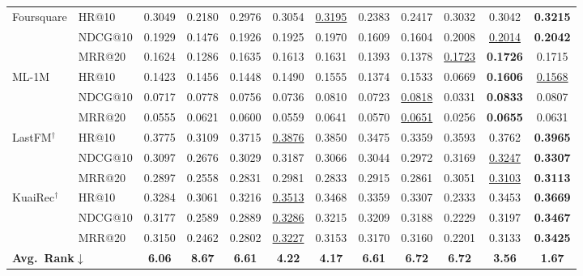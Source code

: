 \documentclass[sigconf,review,anonymous]{acmart}
\newcommand{\tblbest}[1]{\textbf{#1}}
\newcommand{\tblsecond}[1]{\underline{#1}}
\begin{document}
\begin{table}[!t]
{\begin{tabular}{ll*{9}{c}>{\columncolor{routerecgray}}c}
    \midrule
    \multirow{3}{*}{Foursquare}
      & HR@10   & 0.3049 & 0.2180 & 0.2976 & 0.3054 & \tblsecond{0.3195} & 0.2383 & 0.2417 & 0.3032 & 0.3042 & \tblbest{0.3215} \\
      & NDCG@10 & 0.1929 & 0.1476 & 0.1926 & 0.1925 & 0.1970 & 0.1609 & 0.1604 & 0.2008 & \tblsecond{0.2014} & \tblbest{0.2042} \\
      & MRR@20  & 0.1624 & 0.1286 & 0.1635 & 0.1613 & 0.1631 & 0.1393 & 0.1378 & \tblsecond{0.1723} & \tblbest{0.1726} & 0.1715 \\
    \midrule
    \multirow{3}{*}{ML-1M}
      & HR@10   & 0.1423 & 0.1456 & 0.1448 & 0.1490 & 0.1555 & 0.1374 & 0.1533 & 0.0669 & \tblbest{0.1606} & \tblsecond{0.1568} \\
      & NDCG@10 & 0.0717 & 0.0778 & 0.0756 & 0.0736 & 0.0810 & 0.0723 & \tblsecond{0.0818} & 0.0331 & \tblbest{0.0833} & 0.0807 \\
      & MRR@20  & 0.0555 & 0.0621 & 0.0600 & 0.0559 & 0.0641 & 0.0570 & \tblsecond{0.0651} & 0.0256 & \tblbest{0.0655} & 0.0631 \\
    \midrule
    \multirow{3}{*}{LastFM$^\dagger$}
      & HR@10   & 0.3775 & 0.3109 & 0.3715 & \tblsecond{0.3876} & 0.3850 & 0.3475 & 0.3359 & 0.3593 & 0.3762 & \tblbest{0.3965} \\
      & NDCG@10 & 0.3097 & 0.2676 & 0.3029 & 0.3187 & 0.3066 & 0.3044 & 0.2972 & 0.3169 & \tblsecond{0.3247} & \tblbest{0.3307} \\
      & MRR@20  & 0.2897 & 0.2558 & 0.2831 & 0.2981 & 0.2833 & 0.2915 & 0.2861 & 0.3051 & \tblsecond{0.3103} & \tblbest{0.3113} \\
    \midrule
    \multirow{3}{*}{KuaiRec$^\dagger$}
      & HR@10   & 0.3284 & 0.3061 & 0.3216 & \tblsecond{0.3513} & 0.3468 & 0.3359 & 0.3307 & 0.2333 & 0.3453 & \tblbest{0.3669} \\
      & NDCG@10 & 0.3177 & 0.2589 & 0.2889 & \tblsecond{0.3286} & 0.3215 & 0.3209 & 0.3188 & 0.2229 & 0.3197 & \tblbest{0.3467} \\
      & MRR@20  & 0.3150 & 0.2462 & 0.2802 & \tblsecond{0.3227} & 0.3153 & 0.3170 & 0.3160 & 0.2201 & 0.3133 & \tblbest{0.3425} \\
    \midrule
    \multicolumn{2}{l}{\textbf{Avg.~Rank$\downarrow$}} & \textbf{6.06} & \textbf{8.67} & \textbf{6.61} & \textbf{4.22} & \textbf{4.17} & \textbf{6.61} & \textbf{6.72} & \textbf{6.72} & \textbf{3.56} & \textbf{1.67} \\
    \bottomrule
  \end{tabular}}
\end{table}
\end{document}
